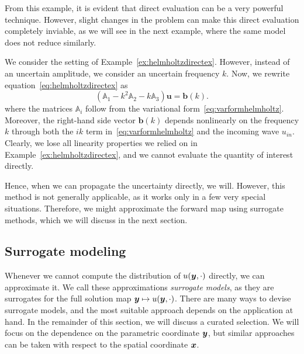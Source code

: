 From this example, it is evident that direct evaluation can be a very powerful technique.
However, slight changes in the problem can make this direct evaluation completely inviable, as we will see in the next example, where the same model does not reduce similarly.
\begin{example}\label{ex:helmholtznonlin}
We consider the setting of Example~\ref{ex:helmholtzdirectex}.
However, instead of an uncertain amplitude, we consider an uncertain frequency $k$.
Now, we rewrite equation~\eqref{eq:helmholtzdirectex} as
\begin{equation*}
    \left( \mathbb{A}_1 - k^2\mathbb{A}_{2} - k \mathbb{A}_3 \right)\bm{u}=\bm{b}(k).\label{eq:helmholtzdirectexnonlin}
\end{equation*}
where the matrices $\mathbb{A}_i$ follow from the variational form~\eqref{eq:varformhelmholtz}.
Moreover, the right-hand side vector $\bm{b}(k)$ depends nonlinearly on the frequency $k$ through both the $ik$ term in~\eqref{eq:varformhelmholtz} and the incoming wave $u_{in}$.
Clearly, we lose all linearity properties we relied on in Example~\ref{ex:helmholtzdirectex}, and we cannot evaluate the quantity of interest directly.
\end{example}
Hence, when we can propagate the uncertainty directly, we will.
However, this method is not generally applicable, as it works only in a few very special situations.
Therefore, we might approximate the forward map using surrogate methods, which we will discuss in the next section.

\subsection{Surrogate modeling}\label{subsec:surrogate-modeling}
Whenever we cannot compute the distribution of $u({\bm{y}},\cdot)$ directly, we can approximate it.
We call these approximations \emph{surrogate models}, as they are surrogates for the full solution map ${\bm{y}}\mapsto u({\bm{y}}, \cdot)$.
There are many ways to devise surrogate models, and the most suitable approach depends on the application at hand.
In the remainder of this section, we will discuss a curated selection.
We will focus on the dependence on the parametric coordinate ${\bm{y}}$, but similar approaches can be taken with respect to the spatial coordinate ${{\bm{x}}}$.

